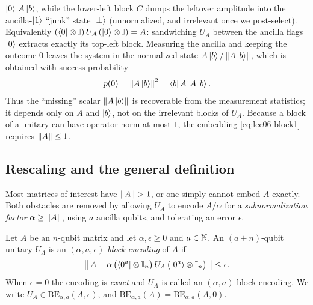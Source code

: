 $\ket0\,A\ket b$, while the lower-left block $C$ dumps the leftover amplitude into the
ancilla-$\ket1$ ``junk'' state $\ket{\perp}$ (unnormalized, and irrelevant once we
post-select). Equivalently
$(\bra{0}\otimes\mathbb{I})\,U_A\,(\ket{0}\otimes\mathbb{I})=A$: sandwiching $U_A$ between the
ancilla flags $\ket0$ extracts exactly its top-left block. Measuring the ancilla and keeping
the outcome $0$ leaves the system in the normalized state $A\ket{b}/\left\lVert A\ket{b} \right\rVert$,
which is obtained with success probability
\begin{equation}
  p(0)=\left\lVert A\ket{b} \right\rVert^2=\bra{b}A^{\dagger} A\ket{b}.
  \label{eq:lec06-prob1}
\end{equation}
Thus the ``missing'' scalar $\left\lVert A\ket{b} \right\rVert$ is recoverable from the measurement
statistics; it depends only on $A$ and $\ket{b}$, not on the irrelevant blocks of
$U_A$. Because a block of a unitary can have operator norm at most $1$, the
embedding \eqref{eq:lec06-block1} requires $\left\lVert A \right\rVert\le1$.

\subsection*{Rescaling and the general definition}

Most matrices of interest have $\left\lVert A \right\rVert>1$, or one simply cannot embed $A$ exactly.
Both obstacles are removed by allowing $U_A$ to encode $A/\alpha$ for a
\emph{subnormalization factor} $\alpha\ge\left\lVert A \right\rVert$, using $a$ ancilla qubits, and
tolerating an error $\epsilon$.

\begin{definition}
\label{def:lec06-be}
Let $A$ be an $n$-qubit matrix and let $\alpha,\epsilon\ge0$ and $a\in\mathbb{N}$. An
$(a+n)$-qubit unitary $U_A$ is an \emph{$(\alpha,a,\epsilon)$-block-encoding} of $A$
if
\begin{equation}
  \left\lVert \,A-\alpha\,\bigl(\bra{0^a}\otimes\mathbb{I}_n\bigr)\,U_A\,
         \bigl(\ket{0^a}\otimes\mathbb{I}_n\bigr)\, \right\rVert\le\epsilon.
  \label{eq:lec06-bedef}
\end{equation}
When $\epsilon=0$ the encoding is \emph{exact} and $U_A$ is called an
$(\alpha,a)$-block-encoding. We write $U_A\in\mathrm{BE}_{\alpha,a}(A,\epsilon)$,
and $\mathrm{BE}_{\alpha,a}(A)=\mathrm{BE}_{\alpha,a}(A,0)$.
\end{definition}

